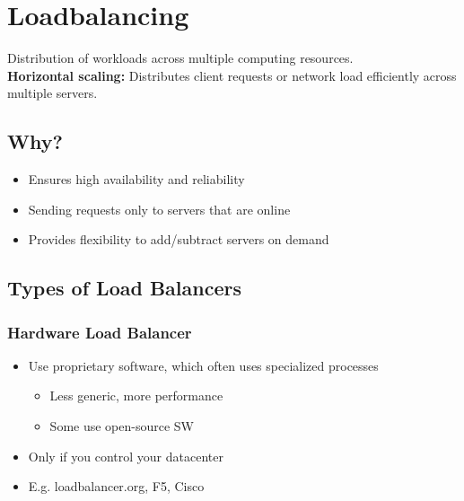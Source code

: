 
\section{Loadbalancing}
Distribution of workloads across multiple computing resources.\\
\textbf{Horizontal scaling:} Distributes client requests or network load efficiently across multiple servers.\\

\subsection{Why?}
\begin{itemize}
    \item Ensures high availability and reliability
    \item Sending requests only to servers that are online
    \item Provides flexibility to add/subtract servers on demand
\end{itemize}

\subsection{Types of Load Balancers}
\subsubsection{Hardware Load Balancer}
\begin{itemize}
    \item Use proprietary software, which often uses specialized processes
    \begin{itemize}
        \item Less generic, more performance
        \item Some use open-source SW
    \end{itemize}
    \item Only if you control your datacenter
    \item E.g. loadbalancer.org, F5, Cisco
\end{itemize}


